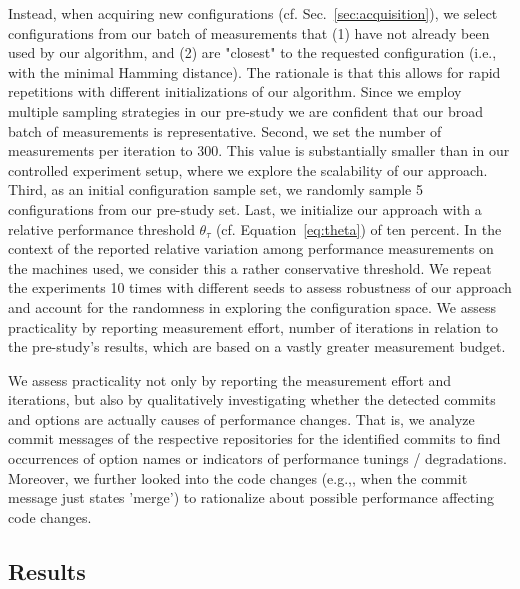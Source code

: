 \documentclass[sigconf]{acmart}
\begin{document}
	 Instead, when acquiring new configurations (cf. Sec.~\ref{sec:acquisition}), we select configurations {\color{red} from our batch of measurements} that (1) have not already been used by our algorithm, and (2) are "closest" to the requested configuration (i.e., with the minimal Hamming distance). The rationale is that this allows for rapid repetitions with different initializations {\color{red}of our algorithm}. Since we employ multiple sampling strategies in our pre-study we are confident that our broad batch of measurements is representative. Second, we set the number of measurements per iteration to 300. This value is substantially smaller than in our controlled experiment setup, where we explore the scalability of our approach. Third, as an initial configuration sample set, we randomly sample 5 configurations from our pre-study set. 
	Last, we initialize our approach with a relative performance threshold $\theta_\tau$ (cf. Equation~\ref{eq:theta}) of ten percent. In the context of the reported relative variation among performance measurements on the machines used, we consider this a rather conservative threshold. 
	We repeat the experiments 10 times with different seeds to assess robustness of our approach and account for the randomness in exploring the configuration space.
	We assess practicality by reporting measurement effort, number of iterations in relation to the pre-study's results, which are based on a vastly greater measurement budget.
	
	We assess practicality not only by reporting the measurement effort and iterations, but also by qualitatively investigating whether the detected commits and options are actually causes of performance changes. That is, we analyze commit messages of the respective repositories for the identified commits to find occurrences of option names or indicators of performance tunings / degradations. Moreover, we further looked into the code changes (e.g.,, when the commit message just states 'merge') to rationalize about possible performance affecting code changes.
	
	\subsection{Results}	
\end{document}
